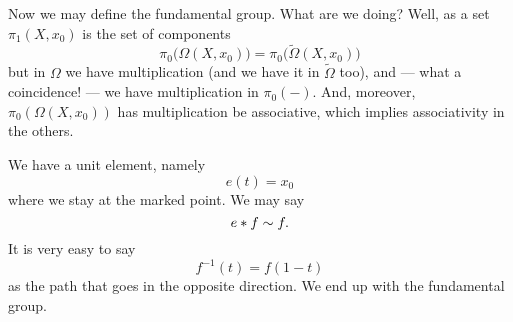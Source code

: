 Now we may define the fundamental group. What are we doing? Well,
as a set $\pi_{1}(X,x_0)$ is the set of components
\begin{equation}
\pi_{0}\bigl(\Omega(X,x_0)\bigr)=\pi_{0}\bigl(\widetilde{\Omega}(X,x_0)\bigr)
\end{equation}
but in $\Omega$ we have multiplication (and we have it in
$\widetilde{\Omega}$ too), and --- what a coincidence! --- we
have multiplication in $\pi_{0}(-)$. And, moreover,
$\pi_{0}(\Omega(X,x_0))$ has multiplication be associative, which
implies associativity in the others.

We have a unit element, namely
\begin{equation}
e(t)=x_0
\end{equation}
where we stay at the marked point. We may say
\begin{equation}
e*f\sim f.
\end{equation}
It is very easy to say
\begin{equation}
f^{-1}(t)=f(1-t)
\end{equation}
as the path that goes in the opposite direction. We end up with
the fundamental group.

